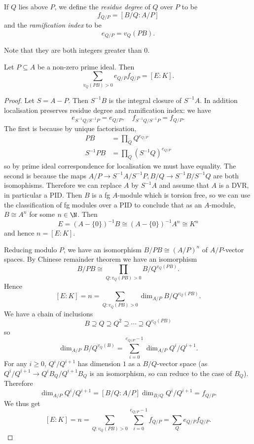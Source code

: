 \documentclass[a4paper]{article}
\begin{document}
\begin{definition}
  If \(Q\) lies above \(P\), we define the \emph{residue degree} of \(Q\) over \(P\) to be
  \[
    f_{Q/P} = [B/Q: A/P]
  \]
  and the \emph{ramification index} to be
  \[
    e_{Q/P} = v_Q(PB).
  \]
\end{definition}
Note that they are both integers greater than \(0\).

\begin{proposition}
  Let \(P \subseteq A\) be a non-zero prime ideal. Then
  \[
    \sum_{v_Q(PB) > 0} e_{Q/P} f_{Q/P} = [E : K].
  \]
\end{proposition}

\begin{proof}
  Let \(S = A - P\). Then \(S^{-1}B\) is the integral closure of \(S^{-1}A\). In addition localisation preserves residue degree and ramification index: we have
  \[
    e_{S^{-1}Q/S^{-1}P} = e_{Q/P}, \quad f_{S^{-1}Q/S^{-1}P} = f_{Q/P}.
  \]
  The first is because by unique factorisation,
  \begin{align*}
    PB &= \prod_Q Q^{e_{Q/P}} \\
    S^{-1}PB &= \prod_{Q} (S^{-1}Q)^{e_{Q/P}}
  \end{align*}
  so by prime ideal correspondence for localisation we must have equality. The second is because the maps \(A/P \to S^{-1}A/S^{-1}P, B/Q \to S^{-1}B/S^{-1}Q\) are both isomophisms. Therefore we can replace \(A\) by \(S^{-1}A\) and assume that \(A\) is a DVR, in particular a PID. Then \(B\) is a fg \(A\)-module which is torsion free, so we can use the classification of fg modules over a PID to conclude that as an \(A\)-module, \(B \cong A^n\) for some \(n \in \N\). Then
  \[
    E = (A - \{0\})^{-1}B \cong (A - \{0\})^{-1}A^n \cong K^n
  \]
  and hence \(n = [E : K]\).

  Reducing modulo \(P\), we have an isomorphism \(B/PB \cong (A/P)^n\) of \(A/P\)-vector spaces. By Chinese remainder theorem we have an isomorphism
  \[
    B/PB \cong \prod_{Q: v_Q(PB) > 0} B/Q^{v_Q(PB)}.
  \]
  Hence
  \[
    [E : K] = n = \sum_{Q: v_Q(PB) > 0} \dim_{A/P} B/Q^{v_Q(PB)}.
  \]
  We have a chain of inclusions
  \[
    B \supseteq Q \supseteq Q^2 \supseteq \cdots \supseteq Q^{v_Q(PB)}
  \]
  so
  \[
    \dim_{A/P} B/Q^{v_Q(B)} = \sum_{i = 0}^{e_{Q/P} - 1} \dim_{A/P} Q^i/Q^{i + 1}.
  \]
  For any \(i \geq 0\), \(Q^i/Q^{i + 1}\) has dimension \(1\) as a \(B/Q\)-vector space (as \(Q^i/Q^{i + 1} \to Q^iB_Q/Q^{i + 1}B_Q\) is an isomorphism, so can reduce to the case of \(B_Q\)). Therefore
  \[
    \dim_{A/P} Q^i/Q^{i + 1} = [B/Q : A/P] \dim_{B/Q} Q^i/Q^{i + 1} = f_{Q/P}.
  \]
  We thus get
  \[
    [E : K] = n = \sum_{Q: v_Q(PB) > 0} \sum_{i = 0}^{e_{Q/P} - 1} f_{Q/P} = \sum_Q e_{Q/P} f_{Q/P}.
  \]
\end{proof}
\end{document}

